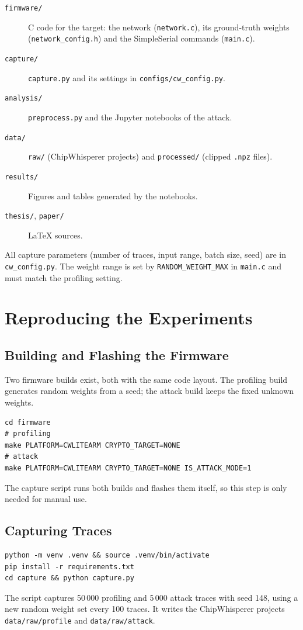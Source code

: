 \begin{description}
	\item[\texttt{firmware/}] C code for the target: the network (\texttt{network.c}), its ground-truth weights (\texttt{network\_config.h}) and the SimpleSerial commands (\texttt{main.c}).
	\item[\texttt{capture/}] \texttt{capture.py} and its settings in \texttt{configs/cw\_config.py}.
	\item[\texttt{analysis/}] \texttt{preprocess.py} and the Jupyter notebooks of the attack.
	\item[\texttt{data/}] \texttt{raw/} (ChipWhisperer projects) and \texttt{processed/} (clipped \texttt{.npz} files).
	\item[\texttt{results/}] Figures and tables generated by the notebooks.
	\item[\texttt{thesis/}, \texttt{paper/}] \LaTeX{} sources.
\end{description}

All capture parameters (number of traces, input range, batch size, seed) are in \texttt{cw\_config.py}.
The weight range is set by \texttt{RANDOM\_WEIGHT\_MAX} in \texttt{main.c} and must match the profiling setting.

\section{Reproducing the Experiments}

\subsection{Building and Flashing the Firmware}

Two firmware builds exist, both with the same code layout.
The profiling build generates random weights from a seed; the attack build keeps the fixed unknown weights.
\begin{verbatim}
cd firmware
# profiling
make PLATFORM=CWLITEARM CRYPTO_TARGET=NONE
# attack
make PLATFORM=CWLITEARM CRYPTO_TARGET=NONE IS_ATTACK_MODE=1
\end{verbatim}
The capture script runs both builds and flashes them itself, so this step is only needed for manual use.

\subsection{Capturing Traces}

\begin{verbatim}
python -m venv .venv && source .venv/bin/activate
pip install -r requirements.txt
cd capture && python capture.py
\end{verbatim}
The script captures 50\,000 profiling and 5\,000 attack traces with seed 148, using a new random weight set every 100 traces.
It writes the ChipWhisperer projects \texttt{data/raw/profile} and \texttt{data/raw/attack}.

